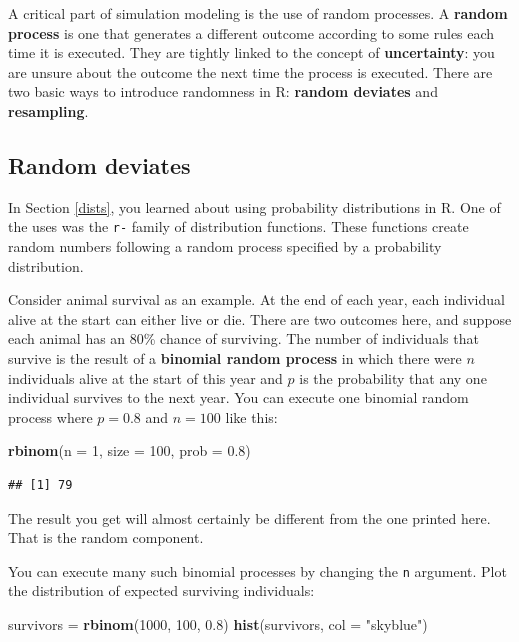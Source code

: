 \documentclass[]{book}
\newenvironment{Shaded}{\begin{snugshade}}{\end{snugshade}}
\newcommand{\DataTypeTok}[1]{\textcolor[rgb]{0.13,0.29,0.53}{#1}}
\newcommand{\DecValTok}[1]{\textcolor[rgb]{0.00,0.00,0.81}{#1}}
\newcommand{\FloatTok}[1]{\textcolor[rgb]{0.00,0.00,0.81}{#1}}
\newcommand{\KeywordTok}[1]{\textcolor[rgb]{0.13,0.29,0.53}{\textbf{#1}}}
\newcommand{\NormalTok}[1]{#1}
\newcommand{\StringTok}[1]{\textcolor[rgb]{0.31,0.60,0.02}{#1}}
\begin{document}
A critical part of simulation modeling is the use of random processes. A \textbf{random process} is one that generates a different outcome according to some rules each time it is executed. They are tightly linked to the concept of \textbf{uncertainty}: you are unsure about the outcome the next time the process is executed. There are two basic ways to introduce randomness in R: \textbf{random deviates} and \textbf{resampling}.

\hypertarget{random-deviates}{%
\subsection{Random deviates}\label{random-deviates}}

In Section \ref{dists}, you learned about using probability distributions in R. One of the uses was the \texttt{r-} family of distribution functions. These functions create random numbers following a random process specified by a probability distribution.

Consider animal survival as an example. At the end of each year, each individual alive at the start can either live or die. There are two outcomes here, and suppose each animal has an 80\% chance of surviving. The number of individuals that survive is the result of a \textbf{binomial random process} in which there were \(n\) individuals alive at the start of this year and \(p\) is the probability that any one individual survives to the next year. You can execute one binomial random process where \(p = 0.8\) and \(n = 100\) like this:

\begin{Shaded}
\begin{Highlighting}[]
\KeywordTok{rbinom}\NormalTok{(}\DataTypeTok{n =} \DecValTok{1}\NormalTok{, }\DataTypeTok{size =} \DecValTok{100}\NormalTok{, }\DataTypeTok{prob =} \FloatTok{0.8}\NormalTok{)}
\end{Highlighting}
\end{Shaded}

\begin{verbatim}
## [1] 79
\end{verbatim}

The result you get will almost certainly be different from the one printed here. That is the random component.

You can execute many such binomial processes by changing the \texttt{n} argument. Plot the distribution of expected surviving individuals:

\begin{Shaded}
\begin{Highlighting}[]
\NormalTok{survivors =}\StringTok{ }\KeywordTok{rbinom}\NormalTok{(}\DecValTok{1000}\NormalTok{, }\DecValTok{100}\NormalTok{, }\FloatTok{0.8}\NormalTok{)}
\KeywordTok{hist}\NormalTok{(survivors, }\DataTypeTok{col =} \StringTok{"skyblue"}\NormalTok{)}
\end{Highlighting}
\end{Shaded}
\end{document}

